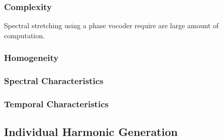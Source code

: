 		\subsubsection*{Complexity}
			Spectral stretching using a phase vocoder require are large amount of computation.
			
		\subsubsection*{Homogeneity}
		\subsubsection*{Spectral Characteristics}
		\subsubsection*{Temporal Characteristics}




	\subsection{Individual Harmonic Generation}
	\label{sec:Excitation-Individuals}

